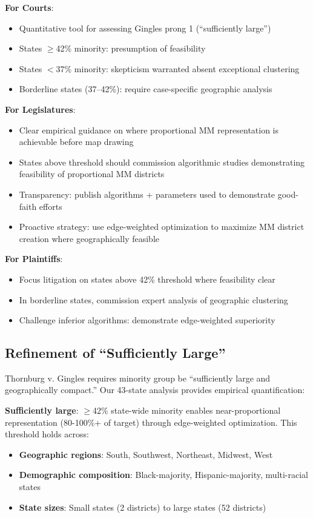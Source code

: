 \textbf{For Courts}:
\begin{itemize}
    \item Quantitative tool for assessing Gingles prong 1 (``sufficiently large'')
    \item States $\geq$42\% minority: presumption of feasibility
    \item States $<$37\% minority: skepticism warranted absent exceptional clustering
    \item Borderline states (37--42\%): require case-specific geographic analysis
\end{itemize}

\textbf{For Legislatures}:
\begin{itemize}
    \item Clear empirical guidance on where proportional MM representation is achievable before map drawing
    \item States above threshold should commission algorithmic studies demonstrating feasibility of proportional MM districts
    \item Transparency: publish algorithms + parameters used to demonstrate good-faith efforts
    \item Proactive strategy: use edge-weighted optimization to maximize MM district creation where geographically feasible
\end{itemize}

\textbf{For Plaintiffs}:
\begin{itemize}
    \item Focus litigation on states above 42\% threshold where feasibility clear
    \item In borderline states, commission expert analysis of geographic clustering
    \item Challenge inferior algorithms: demonstrate edge-weighted superiority
\end{itemize}

\subsection{Refinement of ``Sufficiently Large''}

Thornburg v. Gingles requires minority group be ``sufficiently large and geographically compact.'' Our 43-state analysis provides empirical quantification:

\textbf{Sufficiently large}: $\geq$42\% state-wide minority enables near-proportional representation (80-100\%+ of target) through edge-weighted optimization. This threshold holds across:
\begin{itemize}
    \item \textbf{Geographic regions}: South, Southwest, Northeast, Midwest, West
    \item \textbf{Demographic composition}: Black-majority, Hispanic-majority, multi-racial states
    \item \textbf{State sizes}: Small states (2 districts) to large states (52 districts)
\end{itemize}

